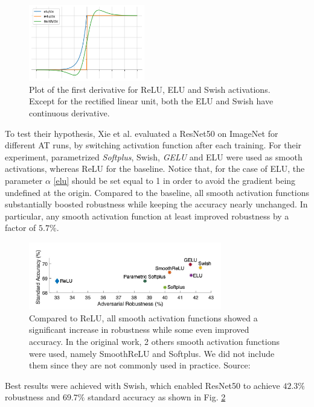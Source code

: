 \documentclass[LaM,binding=0.6cm]{./packages/sapthesis/sapthesis}
\begin{document}
    \begin{figure}[h]
        \centering
        \includegraphics[width=0.45\textwidth]{smothaf.png}
        \caption{Plot of the first derivative for ReLU, ELU and Swish activations. Except for the rectified linear unit, both the ELU and Swish have continuous
        derivative.}
        \label{fig:smoothaf}
    \end{figure}

    To test their hypothesis, Xie et al. evaluated a ResNet50 on ImageNet for different AT runs, by switching activation function after each training. For their experiment,
    parametrized \textit{Softplus}, Swish, \textit{GELU} and ELU were used as smooth activations, whereas ReLU for the baseline. Notice that,
    for the case of ELU, the parameter $\alpha$ \ref{elu} should be set equal to 1 in order to avoid the gradient being undefined at the origin. Compared to the 
    baseline, all smooth activation functions substantially boosted robustness while keeping the accuracy nearly unchanged. In particular, any smooth activation 
    function at least improved robustness by a factor of $5.7\%$. 
    \begin{figure}[t]
        \centering
        \includegraphics[width=0.75\textwidth]{smoothresults}
        \caption{Compared to ReLU, all smooth activation functions showed a significant increase in robustness
        while some even improved accuracy. In the original work, 2 others smooth activation functions were used, namely 
        SmoothReLU and Softplus. We did not include them since they are not commonly used in practice. Source: \cite{smooth_adversarial_training}}
        \label{fig:smoothresults}
    \end{figure}
    Best results were achieved with Swish, which enabled
    ResNet50 to achieve $42.3\%$ robustness and $69.7\%$ standard accuracy as shown 
    in Fig. \ref{fig:smoothresults}
\end{document}
